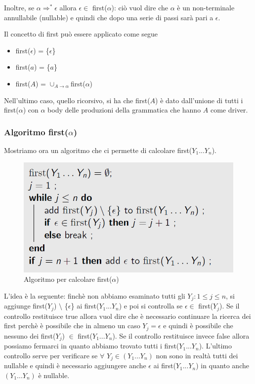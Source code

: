 \documentclass[class=book, crop=false, oneside, 12pt]{standalone}
\begin{document}
Inoltre, se \(\alpha \Rightarrow^* \epsilon\) allora \(\epsilon \in\) first(\(\alpha\)): ciò vuol dire che \(\alpha\) è un non-terminale annullabile (nullable) e quindi che dopo una serie di passi sarà pari a \(\epsilon\).

Il concetto di first può essere applicato come segue

\begin{itemize}
    \item first(\(\epsilon\)) = \{\(\epsilon\)\}
    \item first(\(a\)) = \{\(a\)\}
    \item first(\(A\)) = \(\cup_{A \rightarrow \alpha}\)first(\(\alpha\))
\end{itemize}

Nell'ultimo caso, quello ricorsivo, si ha che first(\(A\)) è dato dall'unione di tutti i first(\(\alpha\)) con \(\alpha\) body delle produzioni della grammatica che hanno \(A\) come driver.

\subsubsection{Algoritmo first(\(\alpha\))}

Mostriamo ora un algoritmo che ci permette di calcolare first(\(Y_1...Y_n\)).

\begin{figure}[H]
    \centering
    \includegraphics[width=.7\textwidth,keepaspectratio]{first-algorithm.png}
    \caption{Algoritmo per calcolare first(\(\alpha\))}
    \label{first-algorithm}
\end{figure}

L'idea è la seguente: finchè non abbiamo esaminato tutti gli \(Y_j : 1 \leq j \leq n\), si aggiunge first(\(Y_j\)) \(\setminus\) \{\(\epsilon\)\} ai first(\(Y_1...Y_n\)) e poi si controlla se \(\epsilon \in\) first(\(Y_j\)). Se il controllo restituisce true allora vuol dire che è necessario continuare la ricerca dei first perchè è possibile che in almeno un caso \(Y_j = \epsilon\) e quindi è possibile che nessuno dei first(\(Y_j\)) \(\in\) first(\(Y_1...Y_n\)). Se il controllo restituisce invece false allora possiamo fermarci in quanto abbiamo trovato tutti i first(\(Y_1...Y_n\)). L'ultimo controllo serve per verificare se \(\forall\) \( Y_j \in (Y_1...Y_n)\) non sono in realtà tutti dei nullable e quindi è necessario aggiungere anche \(\epsilon\) ai first(\(Y_1...Y_n\)) in quanto anche \((Y_1...Y_n)\) è nullable.
\end{document}
